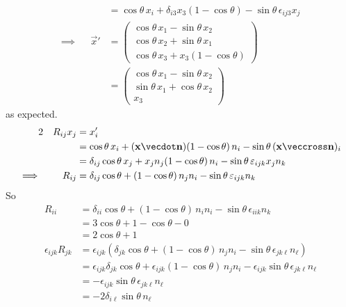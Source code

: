 \documentclass[fleqn,a4paper,11pt]{article}
\begin{document}
\begin{enumerate}[label=\textbf{\arabic*.}]
\begin{alignat*}
     &&      &= \cos \theta\,x_i + \delta_{i3} x_3(1 - \cos \theta) -
                \sin \theta\,\epsilon_{ij3}x_j \\
     \implies{}&& \vec x'
      &=
      \begin{pmatrix}
       \cos\theta\,x_1 - \sin\theta\,x_2 \\
       \cos\theta\,x_2 + \sin\theta\,x_1 \\
       \cos\theta\,x_3 + x_3(1 - \cos\theta)
      \end{pmatrix} \\
     && &=
      \begin{pmatrix}
       \cos\theta\,x_1 - \sin\theta\,x_2 \\
       \sin\theta\,x_1 + \cos\theta\,x_2 \\
       x_3
      \end{pmatrix}
    \end{alignat*}
    as expected.
    \begin{alignat*}2
     &&  R_{ij} x_j &= x_i' \\
     && &= \cos\theta\,x_i + (\vec x \vecdot \vec n)(1 - \cos\theta)\,n_i
           - \sin\theta\,(\vec x \veccross \vec n)_i \\
     && &= \delta_{ij} \cos\theta\,x_j + x_j n_j (1 - \cos\theta)\,n_i
           - \sin\theta\,\epsilon_{ijk}x_j n_k \\
     \implies{}&&
       R_{ij} &= \delta_{ij} \cos\theta + (1 - \cos\theta)\,n_j n_i
                     - \sin\theta\,\epsilon_{ijk}n_k
    \end{alignat*}
    So
    \begin{align*}
      R_{ii} &= \delta_{ii} \cos\theta + (1 - \cos\theta)\,n_i n_i
                    - \sin\theta\,\epsilon_{iik}n_k \\
      &= 3\cos \theta + 1 - \cos \theta - 0 \\
      &= 2 \cos \theta + 1 \\
     \epsilon_{ijk}  R_{jk}
      &= \epsilon_{ijk} (\delta_{jk} \cos \theta + (1 - \cos \theta)\,n_j n_i
                         - \sin\theta\,\epsilon_{jk\ell} n_\ell) \\
      &= \epsilon_{ijk} \delta_{jk} \cos \theta +
          \epsilon_{ijk} (1 - \cos \theta)\,n_j n_i -
          \epsilon_{ijk} \sin\theta\,\epsilon_{jk\ell} n_\ell \\
      &= - \epsilon_{ijk} \sin\theta\,\epsilon_{jk\ell} n_\ell \\
      &= - 2\delta_{i\ell} \sin\theta\,n_\ell \\

\end{align*}
\end{enumerate}
\end{document}
